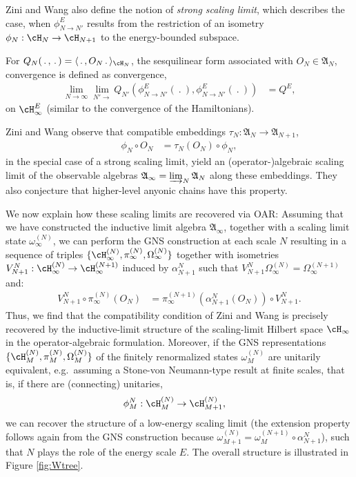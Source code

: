 \documentclass[a4paper, 11pt]{article}
\newcommand{\fA}{\mathfrak{A}}\newcommand{\cA}{\mathcal{A}}\newcommand{\dA}{\mathds{A}}\newcommand{\sA}{\mathscr{A}}
\DeclareMathOperator{\1}{\mathds{1}}
\begin{document}
Zini and Wang also define the notion of \emph{strong scaling limit}, which describes the case, when $\phi^{E}_{N\rightarrow N'}$ results from the restriction of an isometry $\phi_{N}:\cH_{N}\rightarrow\cH_{N+1}$ to the energy-bounded subspace.

For $Q_{N}(\!\ .\!\ ,\!\ .\!\ ) = \langle\!\ .\!\ ,O_{N}\!\ .\!\ \rangle_{\cH_{N}}$, the sesquilinear form associated with $O_{N}\in\fA_{N}$, convergence is defined as convergence,
\begin{align*}
\lim_{N\rightarrow\infty}\lim_{N'\rightarrow}Q_{N'}(\phi^{E}_{N\rightarrow N'}(\!\ .\!\ ),\phi^{E}_{N\rightarrow N'}(\!\ .\!\ )) & = Q^{E},
\end{align*}
on $\cH^{E}_{\infty}$ (similar to the convergence of the Hamiltonians).

Zini and Wang observe \cite[p. 898]{ZiniConformalFieldTheories} that compatible embeddings $\tau_{N}:\fA_{N}\rightarrow\fA_{N+1}$,
\begin{align*}
\phi_{N}\circ O_{N} & = \tau_{N}(O_{N}) \circ \phi_{N},
\end{align*}
 in the special case of a strong scaling limit, yield an (operator-)algebraic scaling limit of the observable algebras $\fA_{\infty} = \varinjlim_{N}\fA_{N}$ along these embeddings. They also conjecture that higher-level anyonic chains have this property. 
 
 We now explain how these scaling limits are recovered via OAR: Assuming that we have constructed the inductive limit algebra $\fA_{\infty}$, together with a scaling limit state $\omega^{(N)}_{\infty}$, we can perform the GNS construction at each scale $N$ resulting in a sequence of triples $\{\cH_{\infty}^{(N)}, \pi_{\infty}^{(N)}, \Omega_{\infty}^{(N)}\}$ together with isometries $V^{N}_{N+1}:\cH_{\infty}^{(N)}\rightarrow\cH_{\infty}^{(N+1)}$ induced by $\alpha^{N}_{N+1}$ such that $V^{N}_{N+1}\Omega_{\infty}^{(N)} = \Omega_{\infty}^{(N+1)}$ and:
\begin{align*}
V^{N}_{N+1}\circ \pi_{\infty}^{(N)}(O_{N}) & = \pi_{\infty}^{(N+1)}(\alpha^{N}_{N+1}(O_{N}))\circ V^{N}_{N+1}.
\end{align*}
Thus, we find that the compatibility condition of Zini and Wang is precisely recovered by the inductive-limit structure of the scaling-limit Hilbert space $\cH_{\infty}$ in the operator-algebraic formulation. Moreover, if the GNS representations $\{\cH_{M}^{(N)}, \pi_{M}^{(N)}, \Omega_{M}^{(N)}\}$ of the finitely renormalized states $\omega^{(N)}_{M}$ are unitarily equivalent, e.g.~assuming a Stone-von Neumann-type result at finite scales, that is, if there are (connecting) unitaries,
\begin{align*}
\phi^{N}_{M} : \cH_{M}^{(N)} & \rightarrow \cH_{M+1}^{(N)},
\end{align*}
we can recover the structure of a low-energy scaling limit (the extension property follows again from the GNS construction because $\omega^{(N)}_{M+1} = \omega^{(N+1)}_{M}\circ\alpha^{N}_{N+1}$), such that $N$ plays the role of the energy scale $E$. The overall structure is illustrated in Figure \ref{fig:Wtree}.
\end{document}
